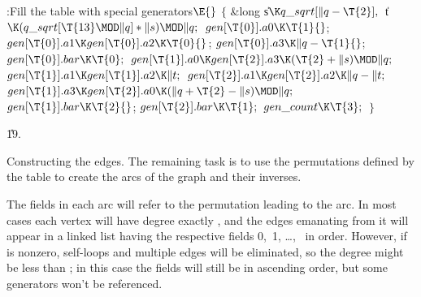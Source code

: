 \Y\B\4:Fill the  table with special generators\X${}\E{}$\6
${}\{{}$\5
\1\&{long} \|s${}\K\\{q\_sqrt}[\|q-\T{2}],{}$ \|t${}\K(\\{q\_sqrt}[\T{13}\MOD%
\|q]*\|s)\MOD\|q;{}$\7
${}\\{gen}[\T{0}].\\{a0}\K\T{1}{}$;\5
${}\\{gen}[\T{0}].\\{a1}\K\\{gen}[\T{0}].\\{a2}\K\T{0}{}$;\5
${}\\{gen}[\T{0}].\\{a3}\K\|q-\T{1}{}$;\5
${}\\{gen}[\T{0}].\\{bar}\K\T{0};{}$\6
${}\\{gen}[\T{1}].\\{a0}\K\\{gen}[\T{2}].\\{a3}\K(\T{2}+\|s)\MOD\|q;{}$\6
${}\\{gen}[\T{1}].\\{a1}\K\\{gen}[\T{1}].\\{a2}\K\|t;{}$\6
${}\\{gen}[\T{2}].\\{a1}\K\\{gen}[\T{2}].\\{a2}\K\|q-\|t;{}$\6
${}\\{gen}[\T{1}].\\{a3}\K\\{gen}[\T{2}].\\{a0}\K(\|q+\T{2}-\|s)\MOD\|q;{}$\6
${}\\{gen}[\T{1}].\\{bar}\K\T{2}{}$;\5
${}\\{gen}[\T{2}].\\{bar}\K\T{1};{}$\6
${}\\{gen\_count}\K\T{3};{}$\6
\4${}\}{}$\2\par
\U19.\fi

Constructing the edges. The remaining task is to use the permutations
defined by the  table to create the arcs of the graph and
their inverses.

The  fields in each arc will refer to the permutation leading to
the
arc. In most cases each vertex  will have degree exactly , and the
edges emanating from it will appear in a linked list having
the respective  fields 0,~1, \dots,~ in order. However,
if  is nonzero, self-loops and multiple edges will be
eliminated,
so the degree might be less than ; in this case the  fields
will still be in ascending order, but some generators won't be referenced.

